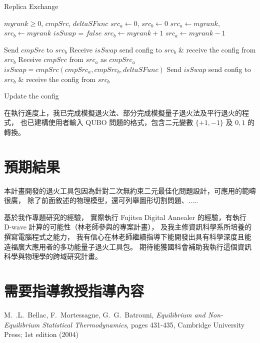\documentclass[12pt]{article}
\begin{document}
\begin{algorithm}
\caption{Replica Exchange}\label{alg:cap}
\begin{algorithmic}
\Require $myrank \geq 0$, $cmpSrc$, $deltaSFunc$
\State $src_a \gets 0$, $src_b \gets 0$
\State $src_a \gets myrank$, $src_b \gets myrank$ 
\State $isSwap$ = $false$ 
    \State $src_b \gets myrank + 1$
\Else
    \State $src_a \gets myrank - 1$
\EndIf

 
    \State Send $cmpSrc$ to $src_b$
    \State Receive $isSwap$
        \State send config to $src_b$ \& receive the config from $src_b$
    \EndIf
{}
    \State Receive $cmpSrc$ from $src_a$ as $cmpSrc_a$
    \State $isSwap = cmpSrc(cmpSrc_a, cmpSrc_b, deltaSFunc)$ 
    \State {}
    \State Send $isSwap$
        \State send config to $src_b$ \& receive the config from $src_b$
    \EndIf
\EndIf

    \State Update the config
\EndIf

\end{algorithmic}
\end{algorithm}

在執行進度上，我已完成模擬退火法、部分完成模擬量子退火法及平行退火的程式，
也已建構使用者輸入 QUBO 問題的格式，包含二元變數 $\{+1, -1\}$ 及 ${0 , 1}$ 的轉換。 


\section{預期結果}

本計畫開發的退火工具包因為針對二次無約束二元最佳化問題設計，可應用的範疇很廣，
除了前面敘述的物理模型，還可列舉圖形切割問題、.....

基於我作專題研究的經驗，
實際執行 Fujitsu Digital Annealer 的經驗，有執行 D-wave 計算的可能性（林老師參與的專案計畫），
及我主修資訊科學系所培養的撰寫電腦程式之能力，
我有信心在林老師繼續指導下能開發出具有科學深度且能造福廣大應用者的多功能量子退火工具包。
期待能獲國科會補助我執行這個資訊科學與物理學的跨域研究計畫。

\section*{需要指導教授指導內容}


\begin{thebibliography}{99}
M.~.L.~Bellac, F.~Mortessagne, G.~G.~Batrouni, {\it Equilibrium and Non-Equilibrium Statistical Thermodynamics},
pages 431-435, Cambridge University Press; 1st edition (2004)
\end{thebibliography}
\end{document}
